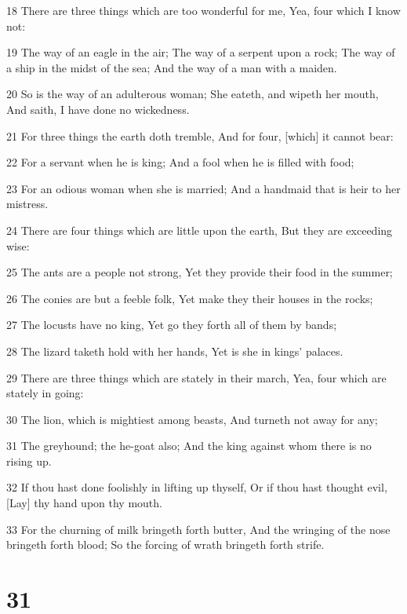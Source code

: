 \par 18 There are three things which are too wonderful for me, Yea, four which I know not:
\par 19 The way of an eagle in the air; The way of a serpent upon a rock; The way of a ship in the midst of the sea; And the way of a man with a maiden.
\par 20 So is the way of an adulterous woman; She eateth, and wipeth her mouth, And saith, I have done no wickedness.
\par 21 For three things the earth doth tremble, And for four, [which] it cannot bear:
\par 22 For a servant when he is king; And a fool when he is filled with food;
\par 23 For an odious woman when she is married; And a handmaid that is heir to her mistress.
\par 24 There are four things which are little upon the earth, But they are exceeding wise:
\par 25 The ants are a people not strong, Yet they provide their food in the summer;
\par 26 The conies are but a feeble folk, Yet make they their houses in the rocks;
\par 27 The locusts have no king, Yet go they forth all of them by bands;
\par 28 The lizard taketh hold with her hands, Yet is she in kings' palaces.
\par 29 There are three things which are stately in their march, Yea, four which are stately in going:
\par 30 The lion, which is mightiest among beasts, And turneth not away for any;
\par 31 The greyhound; the he-goat also; And the king against whom there is no rising up.
\par 32 If thou hast done foolishly in lifting up thyself, Or if thou hast thought evil, [Lay] thy hand upon thy mouth.
\par 33 For the churning of milk bringeth forth butter, And the wringing of the nose bringeth forth blood; So the forcing of wrath bringeth forth strife.

\chapter{31}

